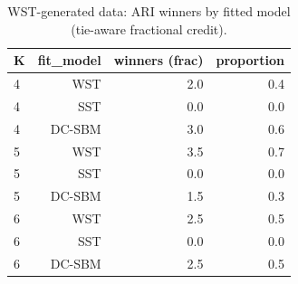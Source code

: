 \begin{table}[!h]
\centering
\caption{WST-generated data: ARI winners by fitted model (tie-aware fractional credit).\\\label{tab:wst-appx-ari-winners}}
\centering
\begin{tabular}[t]{lrrr}
\toprule
K & fit_model & winners (frac) & proportion\\
\midrule
4 & WST & 2.0 & 0.4\\
4 & SST & 0.0 & 0.0\\
4 & DC-SBM & 3.0 & 0.6\\
5 & WST & 3.5 & 0.7\\
5 & SST & 0.0 & 0.0\\
5 & DC-SBM & 1.5 & 0.3\\
6 & WST & 2.5 & 0.5\\
6 & SST & 0.0 & 0.0\\
6 & DC-SBM & 2.5 & 0.5\\
\bottomrule
\end{tabular}
\end{table}
